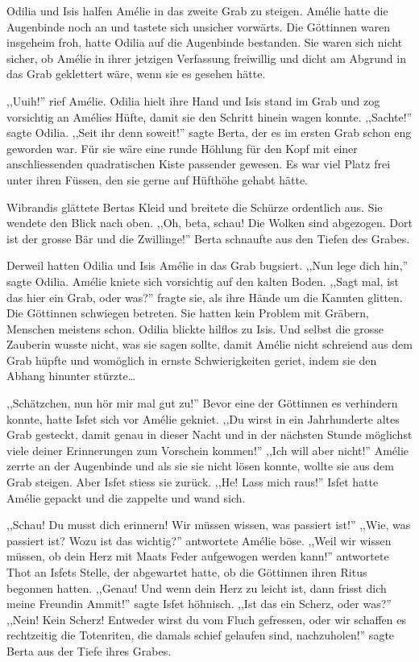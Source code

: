 \documentclass[11pt,titlepage,a5paper]{book}
\begin{document}
Odilia und Isis halfen Amélie in das zweite Grab zu steigen. Amélie hatte die Augenbinde noch an und tastete sich unsicher vorwärts. Die Göttinnen waren insgeheim froh, hatte Odilia auf die Augenbinde bestanden. Sie waren sich nicht sicher, ob Amélie in ihrer jetzigen Verfassung freiwillig und dicht am Abgrund in das Grab geklettert wäre, wenn sie es gesehen hätte.

,,Uuih!'' rief Amélie. Odilia hielt ihre Hand und Isis stand im Grab und zog vorsichtig an Amélies Hüfte, damit sie den Schritt hinein wagen konnte. ,,Sachte!'' sagte Odilia. ,,Seit ihr denn soweit!'' sagte Berta, der es im ersten Grab schon eng geworden war. Für sie wäre eine runde Höhlung für den Kopf mit einer anschliessenden quadratischen Kiste passender gewesen. Es war viel Platz frei unter ihren Füssen, den sie gerne auf Hüfthöhe gehabt hätte.

Wibrandis glättete Bertas Kleid und breitete die Schürze ordentlich aus. Sie wendete den Blick nach oben. ,,Oh, beta, schau! Die Wolken sind abgezogen. Dort ist der grosse Bär und die Zwillinge!'' Berta schnaufte aus den Tiefen des Grabes.

Derweil hatten Odilia und Isis Amélie in das Grab bugsiert. ,,Nun lege dich hin,'' sagte Odilia. Amélie kniete sich vorsichtig auf den kalten Boden. ,,Sagt mal, ist das hier ein Grab, oder was?'' fragte sie, als ihre Hände um die Kannten glitten. Die Göttinnen schwiegen betreten. Sie hatten kein Problem mit Gräbern, Menschen meistens schon. Odilia blickte hilflos zu Isis. Und selbst die grosse Zauberin wusste nicht, was sie sagen sollte, damit Amélie nicht schreiend aus dem Grab hüpfte und womöglich in ernste Schwierigkeiten geriet, indem sie den Abhang hinunter stürzte\dots

,,Schätzchen, nun hör mir mal gut zu!'' Bevor eine der Göttinnen es verhindern konnte, hatte Isfet sich vor Amélie gekniet. ,,Du wirst in ein Jahrhunderte altes Grab gesteckt, damit genau in dieser Nacht und in der nächsten Stunde möglichst viele deiner Erinnerungen zum Vorschein kommen!'' ,,Ich will aber nicht!'' Amélie zerrte an der Augenbinde und als sie sie nicht lösen konnte, wollte sie aus dem Grab steigen. Aber Isfet stiess sie zurück. ,,He! Lass mich raus!'' Isfet hatte Amélie gepackt und die zappelte und wand sich.

,,Schau! Du musst dich erinnern! Wir müssen wissen, was passiert ist!'' ,,Wie, was passiert ist? Wozu ist das wichtig?'' antwortete Amélie böse. ,,Weil wir wissen müssen, ob dein Herz mit Maats Feder aufgewogen werden kann!'' antwortete Thot an Isfets Stelle, der abgewartet hatte, ob die Göttinnen ihren Ritus begonnen hatten. ,,Genau! Und wenn dein Herz zu leicht ist, dann frisst dich meine Freundin Ammit!'' sagte Isfet höhnisch. ,,Ist das ein Scherz, oder was?'' ,,Nein! Kein Scherz! Entweder wirst du vom Fluch gefressen, oder wir schaffen es rechtzeitig die Totenriten, die damals schief gelaufen sind, nachzuholen!'' sagte Berta aus der Tiefe ihres Grabes.
\end{document}
